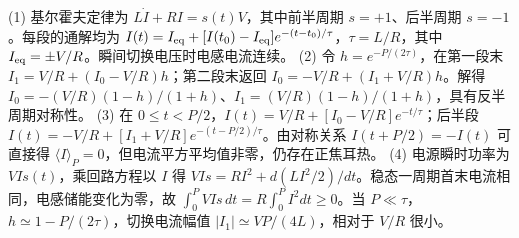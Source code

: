 (1) 基尔霍夫定律为 \(L\dot I+RI=s(t)V\)，其中前半周期 \(s=+1\)、后半周期 \(s=-1\)。每段的通解均为 \(I(t)=I_{\rm eq}+[I(t_0)-I_{\rm eq}]e^{-(t-t_0)/\tau}\)，\(\tau=L/R\)，其中 \(I_{\rm eq}=\pm V/R\)。瞬间切换电压时电感电流连续。
(2) 令 \(h=e^{-P/(2\tau)}\)，在第一段末 \(I_1=V/R+(I_0-V/R)h\)；第二段末返回 \(I_0=-V/R+(I_1+V/R)h\)。解得 \(I_0=-(V/R)(1-h)/(1+h)\)、\(I_1=(V/R)(1-h)/(1+h)\)，具有反半周期对称性。
(3) 在 \(0\le t<P/2\)，\(I(t)=V/R+[I_0-V/R]e^{-t/\tau}\)；后半段 \(I(t)=-V/R+[I_1+V/R]e^{-(t-P/2)/\tau}\)。由对称关系 \(I(t+P/2)=-I(t)\) 可直接得 \(\langle I\rangle_P=0\)，但电流平方平均值非零，仍存在正焦耳热。
(4) 电源瞬时功率为 \(VI s(t)\)，乘回路方程以 \(I\) 得 \(VIs=RI^2+d(LI^2/2)/dt\)。稳态一周期首末电流相同，电感储能变化为零，故 \(\int_0^P VIs\,dt=R\int_0^PI^2dt\ge0\)。当 \(P\ll\tau\)，\(h\simeq1-P/(2\tau)\)，切换电流幅值 \(|I_1|\simeq VP/(4L)\)，相对于 \(V/R\) 很小。
